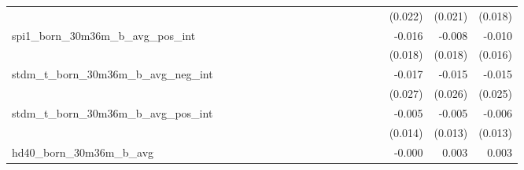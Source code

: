 \begin{tabular}{lrrrrrrrrrrrrrrrrrr}
                                            &              &              &              &              &              &              &              &              &               &              &              &               &              &              &               &      (0.022) &      (0.021) &       (0.018) \\ 
spi1\_born\_30m36m\_b\_avg\_pos\_int        &              &              &              &              &              &              &              &              &               &              &              &               &              &              &               &       -0.016 &       -0.008 &        -0.010 \\ 
                                            &              &              &              &              &              &              &              &              &               &              &              &               &              &              &               &      (0.018) &      (0.018) &       (0.016) \\ 
stdm\_t\_born\_30m36m\_b\_avg\_neg\_int     &              &              &              &              &              &              &              &              &               &              &              &               &              &              &               &       -0.017 &       -0.015 &        -0.015 \\ 
                                            &              &              &              &              &              &              &              &              &               &              &              &               &              &              &               &      (0.027) &      (0.026) &       (0.025) \\ 
stdm\_t\_born\_30m36m\_b\_avg\_pos\_int     &              &              &              &              &              &              &              &              &               &              &              &               &              &              &               &       -0.005 &       -0.005 &        -0.006 \\ 
                                            &              &              &              &              &              &              &              &              &               &              &              &               &              &              &               &      (0.014) &      (0.013) &       (0.013) \\ 
hd40\_born\_30m36m\_b\_avg                  &              &              &              &              &              &              &              &              &               &              &              &               &              &              &               &       -0.000 &        0.003 &         0.003 \\ 

\end{tabular}
